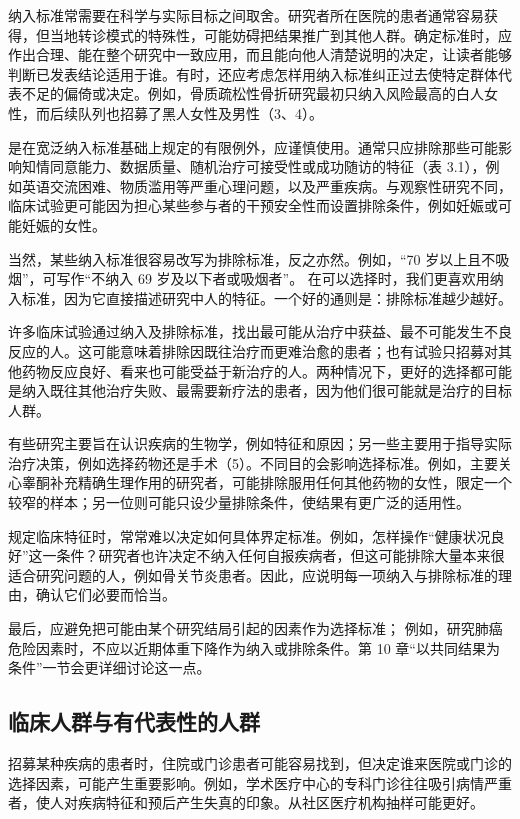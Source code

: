 纳入标准常需要在科学与实际目标之间取舍。研究者所在医院的患者通常容易获得，但当地转诊模式的特殊性，可能妨碍把结果推广到其他人群。确定标准时，应作出合理、能在整个研究中一致应用，而且能向他人清楚说明的决定，让读者能够判断已发表结论适用于谁。有时，还应考虑怎样用纳入标准纠正过去使特定群体代表不足的偏倚或决定。例如，骨质疏松性骨折研究最初只纳入风险最高的白人女性，而后续队列也招募了黑人女性及男性（3、4）。

是在宽泛纳入标准基础上规定的有限例外，应谨慎使用。通常只应排除那些可能影响知情同意能力、数据质量、随机治疗可接受性或成功随访的特征（表 3.1），例如英语交流困难、物质滥用等严重心理问题，以及严重疾病。与观察性研究不同，临床试验更可能因为担心某些参与者的干预安全性而设置排除条件，例如妊娠或可能妊娠的女性。

当然，某些纳入标准很容易改写为排除标准，反之亦然。例如，“70 岁以上且不吸烟”，可写作“不纳入 69 岁及以下者或吸烟者”。
在可以选择时，我们更喜欢用纳入标准，因为它直接描述研究中人的特征。一个好的通则是：排除标准越少越好。

许多临床试验通过纳入及排除标准，找出最可能从治疗中获益、最不可能发生不良反应的人。这可能意味着排除因既往治疗而更难治愈的患者；也有试验只招募对其他药物反应良好、看来也可能受益于新治疗的人。两种情况下，更好的选择都可能是纳入既往其他治疗失败、最需要新疗法的患者，因为他们很可能就是治疗的目标人群。

有些研究主要旨在认识疾病的生物学，例如特征和原因；另一些主要用于指导实际治疗决策，例如选择药物还是手术（5）。不同目的会影响选择标准。例如，主要关心睾酮补充精确生理作用的研究者，可能排除服用任何其他药物的女性，限定一个较窄的样本；另一位则可能只设少量排除条件，使结果有更广泛的适用性。

规定临床特征时，常常难以决定如何具体界定标准。例如，怎样操作“健康状况良好”这一条件？研究者也许决定不纳入任何自报疾病者，但这可能排除大量本来很适合研究问题的人，例如骨关节炎患者。因此，应说明每一项纳入与排除标准的理由，确认它们必要而恰当。

最后，应避免把可能由某个研究结局引起的因素作为选择标准；
例如，研究肺癌危险因素时，不应以近期体重下降作为纳入或排除条件。第 10 章“以共同结果为条件”一节会更详细讨论这一点。

\subsection{临床人群与有代表性的人群}
招募某种疾病的患者时，住院或门诊患者可能容易找到，但决定谁来医院或门诊的选择因素，可能产生重要影响。例如，学术医疗中心的专科门诊往往吸引病情严重者，使人对疾病特征和预后产生失真的印象。从社区医疗机构抽样可能更好。

